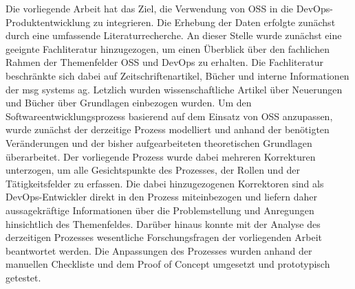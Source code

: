 Die vorliegende Arbeit hat das Ziel, die Verwendung von OSS in die DevOps-Produktentwicklung zu integrieren. Die Erhebung der Daten erfolgte zunächst durch eine umfassende Literaturrecherche. An dieser Stelle wurde zunächst eine geeignte Fachliteratur hinzugezogen, um einen Überblick über den fachlichen Rahmen der Themenfelder OSS und DevOps zu erhalten. Die Fachliteratur beschränkte sich dabei auf Zeitschriftenartikel, Bücher und interne Informationen der msg systems ag. Letzlich wurden wissenschaftliche Artikel über Neuerungen und Bücher über Grundlagen einbezogen wurden. Um den Softwareentwicklungsprozess basierend auf dem Einsatz von OSS anzupassen, wurde zunächst der derzeitige Prozess modelliert und anhand der benötigten Veränderungen und der bisher aufgearbeiteten theoretischen Grundlagen überarbeitet. Der vorliegende Prozess wurde dabei mehreren Korrekturen unterzogen, um alle Gesichtspunkte des Prozesses, der Rollen und der Tätigkeitsfelder zu erfassen. Die dabei hinzugezogenen Korrektoren sind als DevOps-Entwickler direkt in den Prozess miteinbezogen und liefern daher aussagekräftige Informationen über die Problemstellung und Anregungen hinsichtlich des Themenfeldes. Darüber hinaus konnte mit der Analyse des derzeitigen Prozesses wesentliche Forschungsfragen der vorliegenden Arbeit beantwortet werden. Die Anpassungen des Prozesses wurden anhand der manuellen Checkliste und dem Proof of Concept umgesetzt und prototypisch getestet. 
